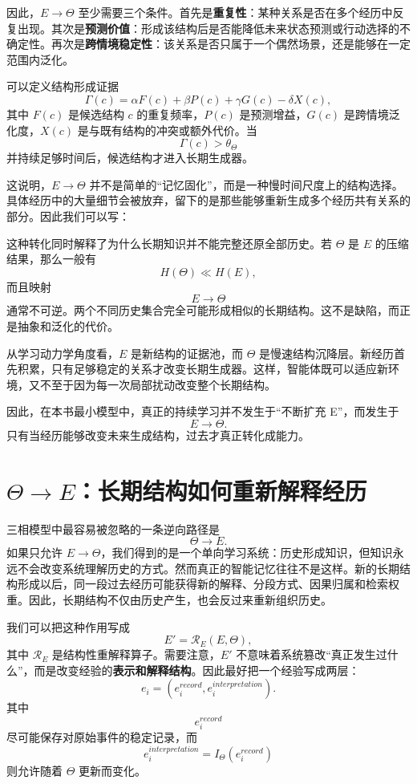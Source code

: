 因此，$E\rightarrow\Theta$ 至少需要三个条件。首先是\textbf{重复性}：某种关系是否在多个经历中反复出现。其次是\textbf{预测价值}：形成该结构后是否能降低未来状态预测或行动选择的不确定性。再次是\textbf{跨情境稳定性}：该关系是否只属于一个偶然场景，还是能够在一定范围内泛化。

可以定义结构形成证据
\[
\Gamma(c)
=
\alpha F(c)
+
\beta P(c)
+
\gamma G(c)
-
\delta X(c),
\]
其中 $F(c)$ 是候选结构 $c$ 的重复频率，$P(c)$ 是预测增益，$G(c)$ 是跨情境泛化度，$X(c)$ 是与既有结构的冲突或额外代价。当
\[
\Gamma(c)>\theta_\Theta
\]
并持续足够时间后，候选结构才进入长期生成器。

这说明，$E\rightarrow\Theta$ 并不是简单的“记忆固化”，而是一种慢时间尺度上的结构选择。具体经历中的大量细节会被放弃，留下的是那些能够重新生成多个经历共有关系的部分。因此我们可以写：
\begin{statementbox}
\centering
{}
\end{statementbox}

这种转化同时解释了为什么长期知识并不能完整还原全部历史。若 $\Theta$ 是 $E$ 的压缩结果，那么一般有
\[
H(\Theta)
\ll
H(E),
\]
而且映射
\[
E\rightarrow\Theta
\]
通常不可逆。两个不同历史集合完全可能形成相似的长期结构。这不是缺陷，而正是抽象和泛化的代价。

从学习动力学角度看，$E$ 是新结构的证据池，而 $\Theta$ 是慢速结构沉降层。新经历首先积累，只有足够稳定的关系才改变长期生成器。这样，智能体既可以适应新环境，又不至于因为每一次局部扰动改变整个长期结构。

因此，在本书最小模型中，真正的持续学习并不发生于“不断扩充 E”，而发生于
\[
\boxed{
E\rightarrow\Theta.
}
\]
只有当经历能够改变未来生成结构，过去才真正转化成能力。

\section{$\Theta\rightarrow E$：长期结构如何重新解释经历}

三相模型中最容易被忽略的一条逆向路径是
\[
\boxed{
\Theta\rightarrow E.
}
\]
如果只允许 $E\rightarrow\Theta$，我们得到的是一个单向学习系统：历史形成知识，但知识永远不会改变系统理解历史的方式。然而真正的智能记忆往往不是这样。新的长期结构形成以后，同一段过去经历可能获得新的解释、分段方式、因果归属和检索权重。因此，长期结构不仅由历史产生，也会反过来重新组织历史。

我们可以把这种作用写成
\[
E'
=
\mathcal R_E
\left(
E,\Theta
\right),
\]
其中 $\mathcal R_E$ 是结构性重解释算子。需要注意，$E'$ 不意味着系统篡改“真正发生过什么”，而是改变经验的\textbf{表示和解释结构}。因此最好把一个经验写成两层：
\[
e_i
=
\left(
e_i^{record},
e_i^{interpretation}
\right).
\]
其中
\[
e_i^{record}
\]
尽可能保存对原始事件的稳定记录，而
\[
e_i^{interpretation}
=
I_\Theta(e_i^{record})
\]
则允许随着 $\Theta$ 更新而变化。

